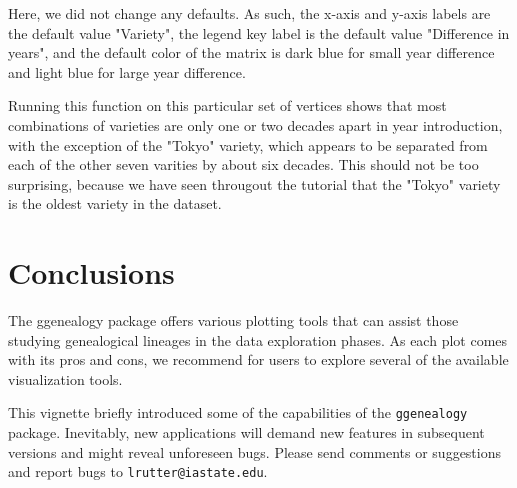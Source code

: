 \documentclass{article}
\numberwithin{equation}{section} %
\newcommand{\pkg}[1]{{\texttt{#1}}}
\begin{document}
Here, we did not change any defaults. As such, the x-axis and y-axis labels are the default value "Variety", the legend key label is the default value "Difference in years", and the default color of the matrix is dark blue for small year difference and light blue for large year difference.

Running this function on this particular set of vertices shows that most combinations of varieties are only one or two decades apart in year introduction, with the exception of the "Tokyo" variety, which appears to be separated from each of the other seven varities by about six decades. This should not be too surprising, because we have seen througout the tutorial that the "Tokyo" variety is the oldest variety in the dataset.

\section{Conclusions}

The ggenealogy package offers various plotting tools that can assist those studying genealogical lineages in the data exploration phases. As each plot comes with its pros and cons, we recommend for users to explore several of the available visualization tools.

This vignette briefly introduced some of the capabilities of the \pkg{ggenealogy} package. Inevitably, new applications will demand new features in subsequent versions and might reveal unforeseen bugs. Please send comments or suggestions and report bugs to \texttt{lrutter@iastate.edu}.
\end{document}

